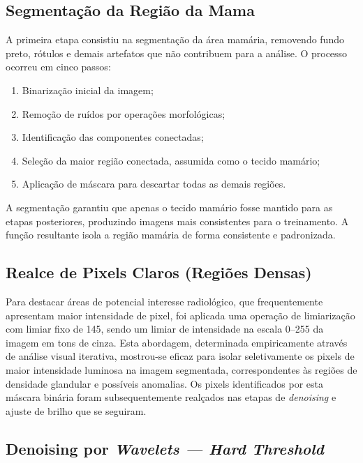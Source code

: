 \subsection*{Segmentação da Região da Mama}

A primeira etapa consistiu na segmentação da área mamária, removendo fundo preto, rótulos e demais artefatos que não contribuem para a análise. O processo ocorreu em cinco passos:

\begin{enumerate}
    \item Binarização inicial da imagem;
    \item Remoção de ruídos por operações morfológicas;
    \item Identificação das componentes conectadas;
    \item Seleção da maior região conectada, assumida como o tecido mamário;
    \item Aplicação de máscara para descartar todas as demais regiões.
\end{enumerate}

A segmentação garantiu que apenas o tecido mamário fosse mantido para as etapas posteriores, produzindo imagens mais consistentes para o treinamento. A função resultante isola a região mamária de forma consistente e padronizada.

\subsection*{Realce de Pixels Claros (Regiões Densas)}

Para destacar áreas de potencial interesse radiológico, que frequentemente apresentam maior intensidade de pixel, foi aplicada uma operação de limiarização com limiar fixo de 145, sendo um limiar de intensidade na escala 0–255 da imagem em tons de cinza. Esta abordagem, determinada empiricamente através de análise visual iterativa, mostrou-se eficaz para isolar seletivamente os pixels de maior intensidade luminosa na imagem segmentada, correspondentes às regiões de densidade glandular e possíveis anomalias. Os pixels identificados por esta máscara binária foram subsequentemente realçados nas etapas de \textit{denoising} e ajuste de brilho que se seguiram.

\subsection*{Denoising por \textit{Wavelets — Hard Threshold}}


